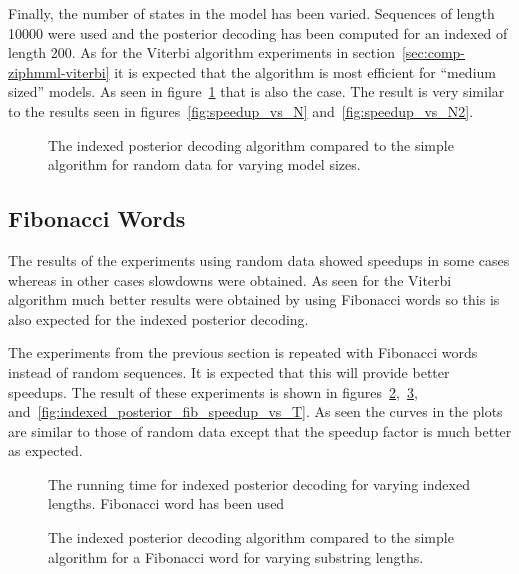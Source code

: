 Finally, the number of states in the model has been varied. Sequences of length
10000 were used and the posterior decoding has been computed for an indexed of
length 200. As for the Viterbi algorithm experiments in
section~\ref{sec:comp-ziphmml-viterbi} it is expected that the algorithm is
most efficient for ``medium sized'' models. As seen in
figure~\ref{fig:indexed_posterior_speedup_vs_N} that is also the case. The
result is very similar to the results seen in figures~\ref{fig:speedup_vs_N}
and~\ref{fig:speedup_vs_N2}.

\begin{figure}
  \centering
  
  \caption{The indexed posterior decoding algorithm compared to the simple
    algorithm for random data for varying model sizes.}
  \label{fig:indexed_posterior_speedup_vs_N}
\end{figure}

\subsection{Fibonacci Words}

The results of the experiments using random data showed speedups in some cases
whereas in other cases slowdowns were obtained. As seen for the Viterbi
algorithm much better results were obtained by using Fibonacci words so this
is also expected for the indexed posterior decoding.

The experiments from the previous section is repeated with Fibonacci words
instead of random sequences. It is expected that this will provide better
speedups. The result of these experiments is shown in
figures~\ref{fig:assymptotic_indexed_posterior_fib_subseq_length.tex},~\ref{fig:fib_indexed_posterior_speedup_vs_subseq},
and~\ref{fig:indexed_posterior_fib_speedup_vs_T}. As seen the curves in the
plots are similar to those of random data except that the speedup factor is
much better as expected.

\begin{figure}
  \centering
  
  \caption{The running time for indexed posterior decoding for
    varying indexed lengths. Fibonacci word has been used}
  \label{fig:assymptotic_indexed_posterior_fib_subseq_length.tex}
\end{figure}

\begin{figure}
  \centering
  
  \caption{The indexed posterior decoding algorithm compared to the simple
    algorithm for a Fibonacci word for varying substring lengths.}
  \label{fig:fib_indexed_posterior_speedup_vs_subseq}
\end{figure}

